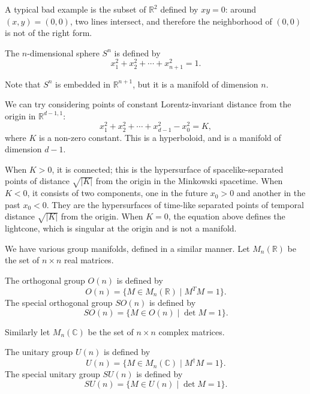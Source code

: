 \documentclass[12pt]{article}
\numberwithin{equation}{section}
\def\bC{\mathbb{C}}
\def\bR{\mathbb{R}}
\begin{document}
A typical bad example is the subset of $\bR^2$ defined by $xy=0$: around $(x,y)=(0,0)$, two lines intersect, and therefore the neighborhood of $(0,0)$ is not of the right form.

\begin{example}
The $n$-dimensional sphere $S^n$ is defined by \begin{equation}
  x_1^2+x_2^2+\cdots+x_{n+1}^2=1.
\end{equation} 
\end{example}
Note that $S^n$ is embedded in $\bR^{n+1}$, but it is a manifold of dimension $n$.

\begin{example}
  We can try considering points of constant Lorentz-invariant distance from the origin in $\bR^{d-1,1}$:
\begin{equation}
  x_1^2+x_2^2+\cdots+x_{d-1}^2-x_0^2=K ,
\end{equation}
where $K$ is a non-zero constant. 
This is a hyperboloid, and is a manifold of dimension $d-1$.
\end{example}
When $K>0$, it is connected; this is the hypersurface of spacelike-separated points 
of distance $\sqrt{|K|}$ from the origin
in the Minkowski spacetime.
When $K<0$, it consists of two components, one in the future $x_0>0$ and another in the past $x_0<0$.
They are the hypersurfaces of time-like separated points of temporal distance $\sqrt{|K|}$ from the origin.
When $K=0$, the equation above defines the lightcone, which is singular at the origin and is not a manifold.

We have various group manifolds, 
defined in a similar manner. 
Let $M_n(\bR)$ be the set of $n\times n$ real matrices.
\begin{example}
The orthogonal group $O(n)$ is defined by \begin{equation}
  O(n) = \{ M\in M_n(\bR) \mid M^T M = 1 \}.
\end{equation}
The special orthogonal group $SO(n)$ is defined by \begin{equation}
  SO(n) = \{ M\in O(n) \mid \det M = 1 \}.
\end{equation}
\end{example}

Similarly let $M_n(\bC)$ be the set of $n\times n$ complex matrices.
\begin{example}
The unitary group $U(n)$ is defined by \begin{equation}
  U(n) = \{ M\in M_n(\bC) \mid M^\dagger M = 1 \}.
\end{equation}
The special unitary group $SU(n)$ is defined by \begin{equation}
  SU(n) = \{ M\in U(n) \mid \det M = 1 \}.
\end{equation}
\end{example}
\end{document}
